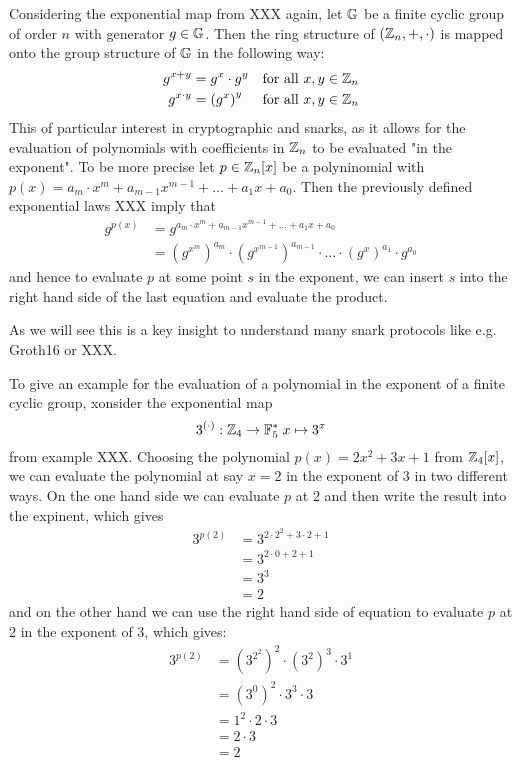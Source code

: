 Considering the exponential map from XXX again, let $\mathbb{G}$ be a finite cyclic group of order $n$ with generator $g\in\mathbb{G}$. Then the ring structure of $(\mathbb{Z}_n,+,\cdot)$ is mapped onto the group structure of $\mathbb{G}$ in the following way:
\begin{align*}
g^{x+y} &= g^x\cdot g^y & \text{for all } x,y\in\mathbb{Z}_n\\
g^{x\cdot y} &= \left( g^x\right)^y & \text{for all } x,y\in\mathbb{Z}_n
\end{align*}
This of particular interest in cryptographic and snarks, as it allows for the evaluation of polynomials with coefficients in $\mathbb{Z}_n$ to be evaluated "in the exponent". To be more precise let $p\in \mathbb{Z}_n[x]$ be a polyninomial with $p(x)=a_m\cdot x^m+a_{m-1}x^{m-1}+\ldots + a_1x +a_0$. Then the previously defined exponential laws XXX imply that
\begin{align*}
g^{p(x)} & = g^{a_m\cdot x^m+a_{m-1}x^{m-1}+\ldots + a_1x +a_0}\\
         & = \left(g^{x^m}\right)^{a_m}\cdot \left(g^{x^{m-1}}\right)^{a_{m-1}}\cdot \ldots\cdot \left(g^{x}\right)^{a_1}\cdot g^{a_0}
\end{align*}
and hence to evaluate $p$ at some point $s$ in the exponent, we can insert $s$ into the right hand side of the last equation and evaluate the product.
 
As we will see this is a key insight to understand many snark protocols like e.g. Groth16 or XXX.
\begin{example} To give an example for the evaluation of a polynomial in the exponent of a finite cyclic group, xonsider the exponential map 
$$
3^{(\cdot)}: \mathbb{Z}_4 \to \mathbb{F}_5^* \; x \mapsto 3^x
$$
from example XXX. Choosing the polynomial $p(x)= 2x^2 +3x +1$ from $\mathbb{Z}_4[x]$, we can evaluate the polynomial at say $x=2$ in the exponent of $3$ in two different ways. On the one hand side we can evaluate $p$ at $2$ and then write the result into the expinent, which gives
\begin{align*}
3^{p(2)} &=3^{2\cdot 2^2+3\cdot 2 +1}\\
          & = 3^{2\cdot 0 +2 +1}\\
          & = 3^{3}\\
          & = 2
\end{align*}
and on the other hand we can use the right hand side of equation to evaluate $p$ at $2$ in the exponent of $3$, which gives: 
\begin{align*}
3^{p(2)} &= \left(3^{2^2}\right)^2 \cdot \left(3^{2}\right)^3\cdot 3^1\\
         &= \left(3^{0}\right)^2 \cdot 3^3\cdot 3\\
         &= 1^2 \cdot 2 \cdot 3\\
         &= 2 \cdot 3\\
         &= 2
\end{align*}
\end{example}

